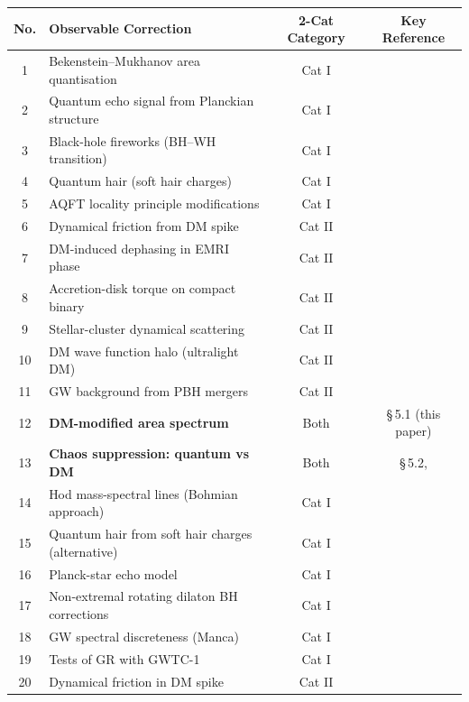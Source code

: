 \documentclass[11pt]{article}
\begin{document}
\begin{table}[htbp]
\centering
\small
\begin{tabular}{c p{5.5cm} c c}
\toprule
\textbf{No.} & \textbf{Observable Correction} & \textbf{2-Cat Category} & \textbf{Key Reference} \\
\midrule
1 & Bekenstein--Mukhanov area quantisation & Cat I & \cite{Bekenstein:1994,Mukhanov:1996} \\
2 & Quantum echo signal from Planckian structure & Cat I & \cite{Cardoso:2016vtg} \\
3 & Black-hole fireworks (BH--WH transition) & Cat I & \cite{Haggard:2014} \\
4 & Quantum hair (soft hair charges) & Cat I & \cite{Mayerson:2019,Dvali:2017} \\
5 & AQFT locality principle modifications & Cat I & \cite{Brunetti:2003} \\
6 & Dynamical friction from DM spike & Cat II & \cite{Gondolo:2003,Yamada:2019} \\
7 & DM-induced dephasing in EMRI phase & Cat II & \cite{Gair:2013,Tang:2018} \\
8 & Accretion-disk torque on compact binary & Cat II & \cite{Frank:2021} \\
9 & Stellar-cluster dynamical scattering & Cat II & \cite{Hopman:2004,Hughes:2001} \\
10 & DM wave function halo (ultralight DM) & Cat II & \cite{Arvanitaki:2010} \\
11 & GW background from PBH mergers & Cat II & \cite{Baryakhtar:2017} \\
12 & \textbf{DM-modified area spectrum} & Both & \S\,5.1 (this paper) \\
13 & \textbf{Chaos suppression: quantum vs DM} & Both & \S\,5.2, \cite{EMRI-Paper-I} \\
\midrule
14 & Hod mass-spectral lines (Bohmian approach) & Cat I & \cite{Hod:1994,Hod:2006} \\
15 & Quantum hair from soft hair charges (alternative) & Cat I & \cite{Gimon:2018} \\
16 & Planck-star echo model & Cat I & \cite{Haggard:2014} \\
17 & Non-extremal rotating dilaton BH corrections & Cat I & \cite{Nicolini:2006} \\
18 & GW spectral discreteness (Manca) & Cat I & \cite{Meissner:2003} \\
19 & Tests of GR with GWTC-1 & Cat I & \cite{LIGOScientific:2019} \\
20 & Dynamical friction in DM spike & Cat II & \cite{Yamada:2019} \\

\end{tabular}
\end{table}
\end{document}
